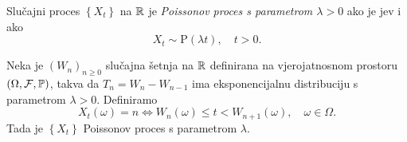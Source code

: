 \documentclass[main.tex]{subfiles}
\begin{document}
\begin{definicija} \label{def:poisson}
	Slučajni proces \( \left\{ X_t \right\} \) na \( \R \) je \emph{Poissonov proces s parametrom \( \lambda > 0\)} ako je \levy jev i ako
	\begin{equation} \label{eq:poispois}
		X_t \sim \mathrm{P}(\lambda t), \quad t > 0.
	\end{equation}
\end{definicija}

\begin{teorem}
	Neka je \( (W_n)_{n \ge 0} \) slučajna šetnja na \( \R \) definirana na vjerojatnosnom prostoru
	\( (\Omega, \mathcal F, \P) \), takva da \( T_n = W_n - W_{n-1} \) ima eksponencijalnu distribuciju
	s parametrom \( \lambda > 0 \). Definiramo
	\begin{equation}\label{eq:poiscons}
		X_t(\omega) = n \iff W_n(\omega) \le t < W_{n+1}(\omega), \quad \omega \in \Omega.
	\end{equation}
	Tada je \( \left\{ X_t \right\} \) Poissonov proces s parametrom \( \lambda \).
\end{teorem}
\end{document}
